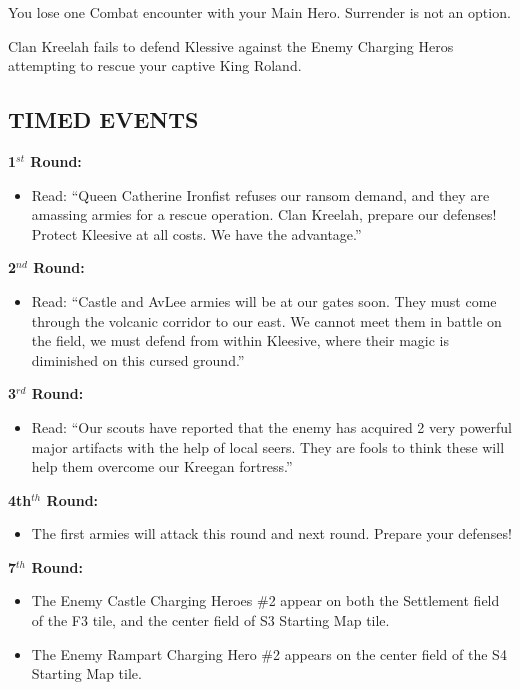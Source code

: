 \begin{multicols*}{2}
You lose one Combat encounter with your Main Hero. Surrender is not an option.

Clan Kreelah fails to defend Klessive against the Enemy Charging Heros attempting to rescue your captive King Roland.

\subsection*{\MakeUppercase{Timed Events}}

\textbf{1$^{st}$ Round:}
\begin{itemize}
  \item Read: ``Queen Catherine Ironfist refuses our ransom demand, and they are amassing armies for a rescue
    operation. Clan Kreelah, prepare our defenses! Protect Kleesive at all costs. We have the advantage.''
\end{itemize}

\textbf{2$^{nd}$ Round:}
\begin{itemize}
  \item Read: ``Castle and AvLee armies will be at our gates soon. They must come through the volcanic corridor
    to our east. We cannot meet them in battle on the field, we must defend from within Kleesive, where
    their magic is diminished on this cursed ground.''
\end{itemize}

\textbf{3$^{rd}$ Round:}
\begin{itemize}
  \item Read: ``Our scouts have reported that the enemy has acquired 2 very powerful major artifacts with the
    help of local seers. They are fools to think these will help them overcome our Kreegan fortress.”
\end{itemize}

\textbf{4th$^{th}$ Round:}
\begin{itemize}
  \item The first armies will attack this round and next round. Prepare your defenses!
\end{itemize}

\textbf{7$^{th}$ Round:}
\begin{itemize}
  \item The Enemy Castle Charging Heroes \#2 appear on both the Settlement field of the F3 tile, and the center field of S3 Starting Map tile. 
  \item The Enemy Rampart Charging Hero \#2 appears on the center field of the S4 Starting Map tile.
\end{itemize}


\end{multicols*}
